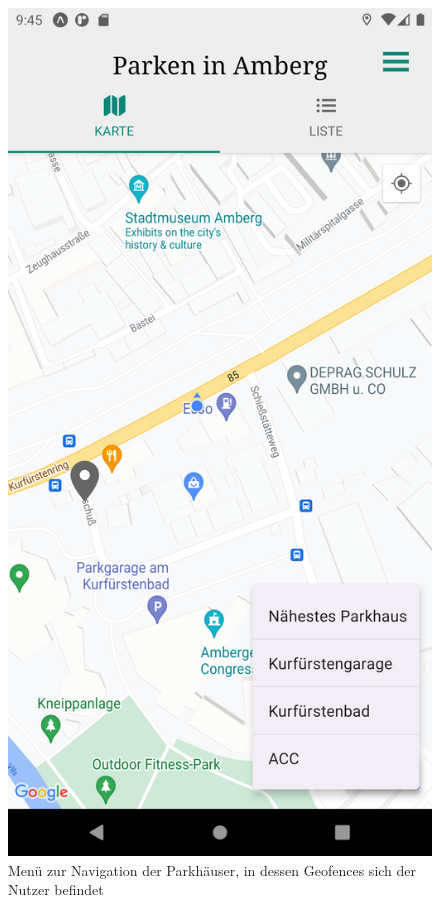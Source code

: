 \begin{figure}
	\vspace{-\baselineskip}
	\centering
	\includegraphics[scale=0.15]{img/geofence_navigation}
	\caption{Menü zur Navigation der Parkhäuser, in dessen Geofences sich der Nutzer befindet}
	\label{fig:geofence_navigation}
\end{figure}
